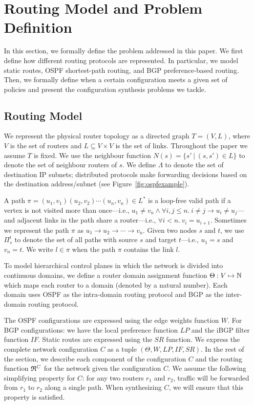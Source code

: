 \section{Routing Model and Problem Definition}
In this section, we formally define the problem addressed in this
paper.  We first define how different
routing protocols are represented.  In particular, we model static
routes, OSPF shortest-path routing, and BGP preference-based routing.
Then, we formally define when a certain configuration meets a given
set of policies and present the configuration synthesis problems
we tackle.

\subsection{Routing Model}

We represent the physical router topology as a directed graph $T=(V, L)$,
where $V$ is the set of routers and $L\subseteq V\times V$ is the set of links. 
Throughout the paper we assume $T$ is fixed.
We use the neighbour function $N(s) = \{s'\ | \ (s,s') \in L \}$ to denote 
the set of neighbour routers of $s$. 
We define $\Lambda$ to denote the set of destination IP subnets;
distributed protocols make forwarding decisions based on the 
destination address/subnet (see Figure~\ref{fig:ospfexample}).

A path $\pi = (u_1,v_1) (u_2, v_2) \cdots (u_n, v_n) \in L^*$ is a loop-free valid path if
a  vertex is not visited more than once---i.e.,
$u_1\neq v_n\wedge\forall i,j \leq n. 
~i \not= j \rightarrow u_i \not= u_j$---and adjacent links in the
path share a router---i.e., $\forall i < n. ~v_i = u_{i+1}$.
Sometimes we represent the path $\pi$ as $u_1\rightarrow u_2 \rightarrow  \cdots \rightarrow v_n$.
Given two nodes $s$ and $t$, we use $\Pi_s^t$ to denote the set of all paths
with source $s$ and target $t$---i.e., $u_1=s$ and  $v_n=t$. 
We write $l \in \pi$ when the path $\pi$ contains the link $l$. 

To model hierarchical control planes in which
 the network is divided into continuous domains,
we define a router domain assignment function
$\Theta: V \mapsto \mathbb{N}$ which maps each router to a domain 
(denoted by a natural number).
Each domain uses OSPF as the intra-domain routing protocol
and BGP as the inter-domain routing protocol. 


The OSPF configurations are expressed 
using the edge weights function $W$. 
For BGP configurations: 
we have the local preference function $LP$ 
and the iBGP filter function $IF$. Static 
routes are expressed using the $SR$ function.
We express the complete network configuration $C$
as a tuple $(\Theta,W,LP,IF,SR)$.  In the 
rest of the section, we describe each component 
of the configuration $C$ and the routing function 
$\mathfrak{R}^C$ for the network given the configuration $C$. 
We assume the following  
simplifying property for $C$: for any two 
routers $r_1$ and $r_2$,
traffic will be forwarded from $r_1$ to $r_2$ 
along a single path. 
When synthesizing $C$, we will ensure that this property is satisfied.


